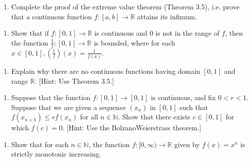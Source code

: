 \documentclass[letterpaper,10pt,english]{jupyterBook}
\begin{document}
\label{\detokenize{Problems:id27}}\begin{enumerate}
%
\setcounter{enumi}{26}
\item {} 
\sphinxAtStartPar
Complete the proof of the extreme value theorem (Theorem 3.5), i.e. prove that a continuous function \(f:[a,b]\to\mathbb{R}\) attains its infimum.

\end{enumerate}
\label{\detokenize{Problems:id28}}\begin{enumerate}
%
\setcounter{enumi}{27}
\item {} 
\sphinxAtStartPar
Show that if \(f:[0,1] \rightarrow \mathbb{R}\) is continuous and \(0\) is not in the range of  \(f\), then the function \(\frac{1}{f}:[0,1]\to \mathbb{R}\) is bounded, where for each \(x \in [0,1], \left(\frac{1}{f}\right)(x) = \frac{1}{f(x)}\).

\end{enumerate}
\label{\detokenize{Problems:id29}}\begin{enumerate}
%
\setcounter{enumi}{28}
\item {} 
\sphinxAtStartPar
Explain why there are no continuous functions having domain \([0, 1]\) and range \(\mathbb{R}\). {[}Hint: Use Theorem 3.5.{]}

\end{enumerate}
\label{\detokenize{Problems:id30}}\begin{enumerate}
%
\setcounter{enumi}{29}
\item {} 
\sphinxAtStartPar
Suppose that the function \(f:[0,1] \rightarrow [0,1]\) is continuous, and fix \(0 < r < 1\). Suppose that we are given a sequence \((x_{n})\) in \([0,1]\) such that \(f(x_{n+1}) \leq rf(x_{n})\) for all \(n\in\mathbb{N}\). Show that there exists \(c \in [0, 1]\) for which \(f(c) = 0\). {[}Hint: Use the Bolzano\sphinxhyphen{}Weierstrass theorem.{]}

\end{enumerate}
\label{\detokenize{Problems:id31}}\begin{enumerate}
%
\setcounter{enumi}{30}
\item {} 
\sphinxAtStartPar
Show that for each \(n\in\mathbb{N}\), the function \(f: [0, \infty)\to\mathbb{R}\) given by \(f(x) =x^{n}\) is strictly monotonic increasing.

\end{enumerate}
\end{document}
